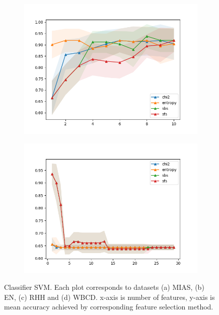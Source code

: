 \begin{figure}[htbp]
  \begin{subfigure}[b]{0.475\textwidth}
      \centering
      \includegraphics[width=\textwidth]{../plots_with_std_fill/SVMd3.png}
      \caption[]%
      {{\small}}
      \label{fig:SVM_RHH}
  \end{subfigure}
  \quad
  \begin{subfigure}[b]{0.475\textwidth}
      \centering
      \includegraphics[width=\textwidth]{../plots_with_std_fill/SVMd4.png}
      \caption[]%
      {{\small}}
      \label{fig:SVM_WBCD}
  \end{subfigure}
  \caption[]
  {\small
    Classifier SVM. Each plot corresponds to datasets (a) MIAS, (b) EN, (c) RHH and (d) WBCD. x-axis is number of features, y-axis is mean accuracy achieved by corresponding feature selection method.
  }
  \label{fig:plots_SVM}
\end{figure}
